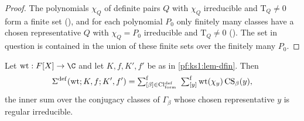 \begin{proof}
The polynomials $\chi_Q$ of definite pairs $Q$ with $\chi_Q$ irreducible and $\mathrm T_Q\neq0$ form a finite set
(), and for each polynomial $P_0$ only finitely many classes have a chosen
representative $Q$ with $\chi_Q=P_0$ irreducible and $\mathrm T_Q\neq0$ ().
The set in question is contained in the union of these finite sets over the finitely many $P_0$.
\end{proof}

\begin{lemma}\label{pf:ks1:lem-regroup}
Let $\mathrm{wt}:F[X]\to\C$ and let $K,f,K',f'$ be as in \cref{pf:ks1:lem-dfin}. Then
\[\Sigma^{\mathrm{def}}(\mathrm{wt};K,f;K',f')=\ksonefs_{[\beta]\in\mathrm{Cl}^{\mathrm{def}}_{\mathrm{form}}}\ \ksonefs_{[y]}\mathrm{wt}(\chi_y)\,\mathrm{CS}_\beta(y),\]
the inner sum over the conjugacy classes of $\Gamma_\beta$ whose chosen representative $y$ is regular irreducible.
\end{lemma}

